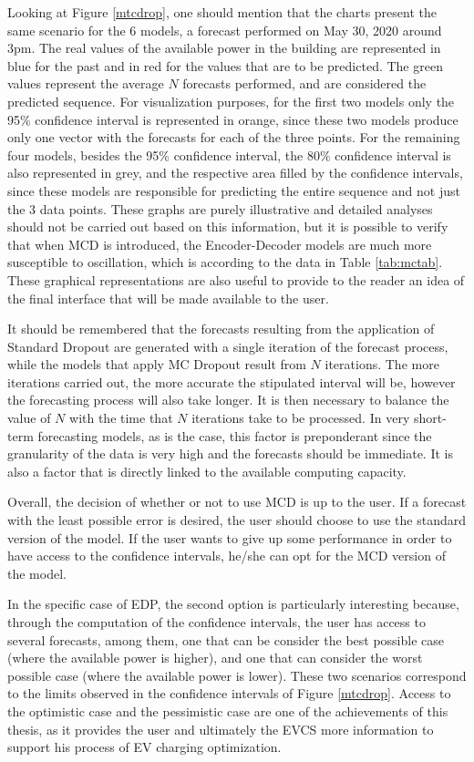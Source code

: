 Looking at Figure \ref{mtcdrop}, one should mention that the charts present the same scenario for the 6 models, a forecast performed on May 30, 2020 around 3pm. The real values of the available power in the building are represented in blue for the past and in red for the values that are to be predicted. The green values represent the average $N$ forecasts performed, and are considered the predicted sequence. For visualization purposes, for the first two models only the 95\% confidence interval is represented in orange, since these two models produce only one vector with the forecasts for each of the three points. For the remaining four models, besides the 95\% confidence interval, the 80\% confidence interval is also represented in grey, and the respective area filled by the confidence intervals, since these models are responsible for predicting the entire sequence and not just the 3 data points. These graphs are purely illustrative and detailed analyses should not be carried out based on this information, but it is possible to verify that when \ac{MCD} is introduced, the Encoder-Decoder models are much more susceptible to oscillation, which is according to the data in Table \ref{tab:mctab}. These graphical representations are also useful to provide to the reader an idea of the final interface that will be made available to the user. 

It should be remembered that the forecasts resulting from the application of Standard Dropout are generated with a single iteration of the forecast process, while the models that apply MC Dropout result from $N$ iterations. The more iterations carried out, the more accurate the stipulated interval will be, however the forecasting process will also take longer. It is then necessary to balance the value of $N$ with the time that $N$ iterations take to be processed. In very short-term forecasting models, as is the case, this factor is preponderant since the granularity of the data is very high and the forecasts should be immediate. It is also a factor that is directly linked to the available computing capacity.


Overall, the decision of whether or not to use MCD is up to the user. If a forecast with the least possible error is desired, the user should choose to use the standard version of the model. If the user wants to give up some performance in order to have access to the confidence intervals, he/she can opt for the MCD version of the model. 

In the specific case of \ac{EDP}, the second option is particularly interesting because, through the computation of the confidence intervals, the user has access to several forecasts, among them, one that can be consider the best possible case (where the available power is higher), and one that can consider the worst possible case (where the available power is lower). These two scenarios correspond to the limits observed in the confidence intervals of Figure \ref{mtcdrop}. Access to the optimistic case and the pessimistic case are one of the achievements of this thesis, as it provides the user and ultimately the \ac{EVCS} more information to support his process of \ac{EV} charging optimization.

